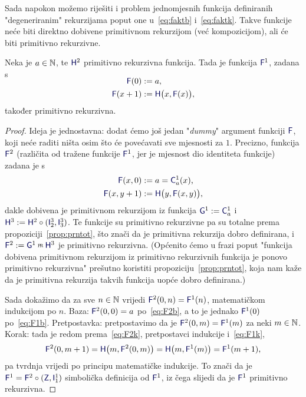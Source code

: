 Sada napokon možemo riješiti i problem jednomjesnih funkcija definiranih "degeneriranim" rekurzijama poput one u~\eqref{eq:faktb} i~\eqref{eq:faktk}. Takve funkcije neće biti direktno dobivene primitivnom rekurzijom (već kompozicijom), ali će biti primitivno rekurzivne.

\begin{propozicija}\label{prop:F1prn}
Neka je $a\in{\mathbb N}$, te $\f H^2$ primitivno rekurzivna funkcija.
    \newline Tada je funkcija $\f F^1$, zadana s
\begin{align}
\SwapAboveDisplaySkip
\label{eq:F1b}
    \f F(0)&:=a\text,\\
\label{eq:F1k}
    \f F(x+1)&:=\f H\bigl(x,\f F(x)\bigr)\text,
\end{align}
također primitivno rekurzivna.
\end{propozicija}
\begin{proof}
Ideja je jednostavna: dodat ćemo još jedan "\!\emph{dummy}" argument funkciji $\f F$, koji neće raditi ništa osim što će povećavati sve mjesnosti za $1$. Precizno, funkcija $\f F^2$ (različita od tražene funkcije $\f F^1$\!, jer je mjesnost dio identiteta funkcije) zadana je s
\begin{align}
\label{eq:F2b}
    \f F(x,0)&:=a=\f C_a^1(x)\text,\\
\label{eq:F2k}
    \f F(x,y+1)&:=\f H\bigl(y,\f F(x,y)\bigr)\text,
\end{align}
dakle dobivena je primitivnom rekurzijom iz funkcija $\f G^1:=\f C_a^1$ i $\f H^3:=\f H^2\circ(\f I_2^3,\f I_3^3)$. Te funkcije su primitivno rekurzivne pa su totalne prema propoziciji~\ref{prop:prntot}, što znači da je primitivna rekurzija dobro definirana, i $\f F^2:=\f G^1\pr\f H^3$ je primitivno rekurzivna. (Općenito ćemo u frazi poput "funkcija dobivena primitivnom rekurzijom iz primitivno rekurzivnih funkcija je ponovo primitivno rekurzivna" prešutno koristiti propoziciju~\ref{prop:prntot}, koja nam kaže da je primitivna rekurzija takvih funkcija uopće dobro definirana.)

Sada dokažimo da za sve $n\in{\mathbb N}$ vrijedi $\f F^2(0,n)=\f F^1(n)$, matematičkom indukcijom po $n$. Baza: $\f F^2(0,0)=a$ po~\eqref{eq:F2b}, a to je jednako $\f F^1(0)$ po~\eqref{eq:F1b}. Pretpostavka: pretpostavimo da je $\f F^2(0,m)=\f F^1(m)$ za neki $m\in{\mathbb N}$. Korak: tada je redom prema~\eqref{eq:F2k}, pretpostavci indukcije i~\eqref{eq:F1k},
\begin{equation}
    \f F^2(0,m+1)=\f H\bigl(m,\f F^2(0,m)\bigr)=\f H\bigl(m,\f F^1(m)\bigr)=\f F^1(m+1)\text,
\end{equation}
pa tvrdnja vrijedi po principu matematičke indukcije. To znači da je $\f F^1=\f F^2\circ(\f Z,\f I_1^1)$ simbolička definicija od $\f F^1$, iz čega slijedi da je $\f F^1$ primitivno rekurzivna.
\end{proof}

